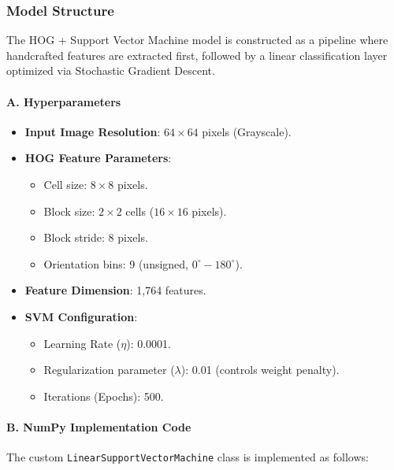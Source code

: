 \documentclass[12pt,a4paper]{article}
\begin{document}
\subsubsection{Model Structure}
The HOG + Support Vector Machine model is constructed as a pipeline where handcrafted features are extracted first, followed by a linear classification layer optimized via Stochastic Gradient Descent.

\paragraph{A. Hyperparameters}
\begin{itemize}
    \item \textbf{Input Image Resolution}: $64 \times 64$ pixels (Grayscale).
    \item \textbf{HOG Feature Parameters}:
    \begin{itemize}
        \item Cell size: $8 \times 8$ pixels.
        \item Block size: $2 \times 2$ cells ($16 \times 16$ pixels).
        \item Block stride: 8 pixels.
        \item Orientation bins: 9 (unsigned, $0^\circ - 180^\circ$).
    \end{itemize}
    \item \textbf{Feature Dimension}: 1,764 features.
    \item \textbf{SVM Configuration}:
    \begin{itemize}
        \item Learning Rate ($\eta$): 0.0001.
        \item Regularization parameter ($\lambda$): 0.01 (controls weight penalty).
        \item Iterations (Epochs): 500.
    \end{itemize}
\end{itemize}

\paragraph{B. NumPy Implementation Code}
The custom \texttt{LinearSupportVectorMachine} class is implemented as follows:
\end{document}
